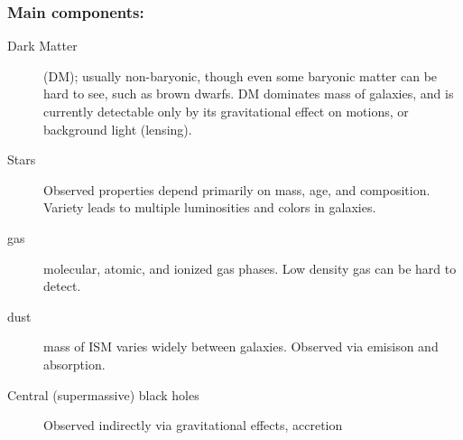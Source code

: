 \documentclass{article}
\begin{document}
\subsubsection{Main components:}
\begin{description}
    \item [Dark Matter] (DM); usually non-baryonic, though even some baryonic
        matter can be hard to see, such as brown dwarfs. DM dominates mass of
        galaxies, and is currently detectable only by its gravitational effect
        on motions, or background light (lensing).
    \item [Stars] Observed properties depend primarily on mass, age,
        and composition. Variety leads to multiple luminosities and colors
        in galaxies.
    \item [gas] molecular, atomic, and ionized gas phases. Low density gas
        can be hard to detect.
    \item [dust] mass of ISM varies widely between galaxies. Observed via
        emisison and absorption.
    \item [Central (supermassive) black holes]
        Observed indirectly via gravitational effects, accretion
\end{description}
\end{document}
